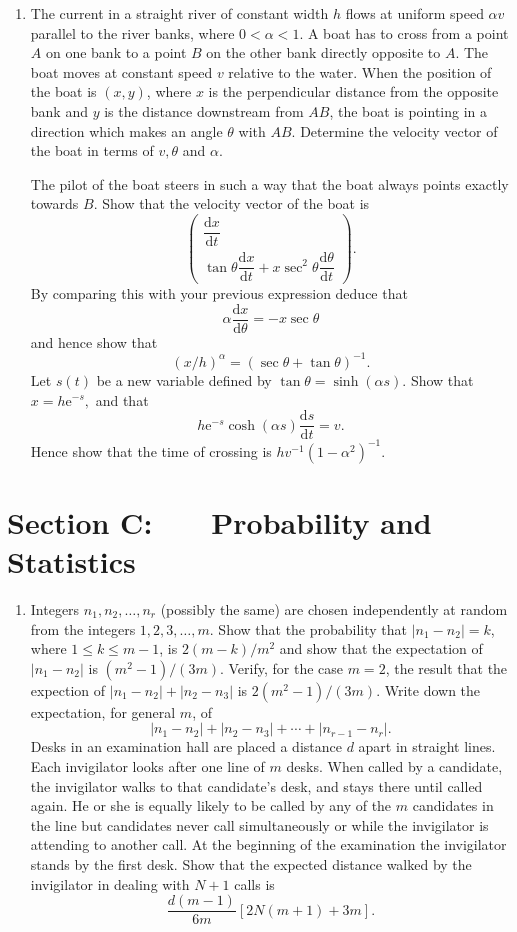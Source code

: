 \documentclass[a4, 11pt]{report}
\newlength{\qspace}
\newcounter{qnumber}
\newenvironment{question}%
 {\vspace{\qspace}
  \begin{enumerate}[\bfseries 1\quad][10]%
    \setcounter{enumi}{\value{qnumber}}%
    \item%
 }
{
  \end{enumerate}
  \filbreak
  \stepcounter{qnumber}
 }
\begin{document}
\begin{question}
	The current in a straight river of constant width $h$ flows at uniform
	speed $\alpha v$ parallel to the river banks, where $0<\alpha<1$.
	A boat has to cross from a point $A$ on one bank to a point $B$
	on the other bank directly opposite to $A$. The boat moves at constant
	speed $v$ relative to the water. When the position of the boat is
	$(x,y)$, where $x$ is the perpendicular distance from the opposite
	bank and $y$ is the distance downstream from $AB$, the boat is pointing
	in a direction which makes an angle $\theta$ with $AB$. Determine
	the velocity vector of the boat in terms of $v,\theta$ and $\alpha.$


	The pilot of the boat steers in such a way that the boat always points
	exactly towards $B$. Show that the velocity vector of the boat is
	\[
	\begin{pmatrix}\dfrac{\mathrm{d}x}{\mathrm{d}t}\\
	\tan\theta\dfrac{\mathrm{d}x}{\mathrm{d}t}+x\sec^{2}\theta\dfrac{\mathrm{d}\theta}{\mathrm{d}t}
	\end{pmatrix}.
	\]
	By comparing this with your previous expression deduce that 
	\[
	\alpha\frac{\mathrm{d}x}{\mathrm{d}\theta}=-x\sec\theta
	\]
	and hence show that
	\[
	(x/h)^{\alpha}=(\sec\theta+\tan\theta)^{-1}.
	\]
	Let $s(t)$ be a new variable defined by $\tan\theta=\sinh(\alpha s).$
	Show that $x=h\mathrm{e}^{-s},$ and that 
	\[
	h\mathrm{e}^{-s}\cosh(\alpha s)\frac{\mathrm{d}s}{\mathrm{d}t}=v.
	\]
	Hence show that the time of crossing is $hv^{-1}(1-\alpha^{2})^{-1}.$
\end{question}
	
	\newpage
\section*{Section C: \ \ \ Probability and Statistics}


\begin{question}
Integers $n_{1},n_{2},\ldots,n_{r}$ (possibly the same) are chosen
independently at random from the integers $1,2,3,\ldots,m$. Show
that the probability that $\left|n_{1}-n_{2}\right|=k$, where $1\leqslant k\leqslant m-1$,
is $2(m-k)/m^{2}$ and show that the expectation of $\left|n_{1}-n_{2}\right|$
is $(m^{2}-1)/(3m)$. Verify, for the case $m=2$, the result that
the expection of $\left|n_{1}-n_{2}\right|+\left|n_{2}-n_{3}\right|$
is $2(m^{2}-1)/(3m).$ Write down the expectation, for general $m$,
of 
\[
\left|n_{1}-n_{2}\right|+\left|n_{2}-n_{3}\right|+\cdots+\left|n_{r-1}-n_{r}\right|.
\]
Desks in an examination hall are placed a distance $d$ apart in straight
lines. Each invigilator looks after one line of $m$ desks. When called
by a candidate, the invigilator walks to that candidate's desk, and
stays there until called again. He or she is equally likely to be
called by any of the $m$ candidates in the line but candidates never
call simultaneously or while the invigilator is attending to another
call. At the beginning of the examination the invigilator stands by
the first desk. Show that the expected distance walked by the invigilator
in dealing with $N+1$ calls is 
\[
\frac{d(m-1)}{6m}[2N(m+1)+3m].
\]
\end{question}
\end{document}
